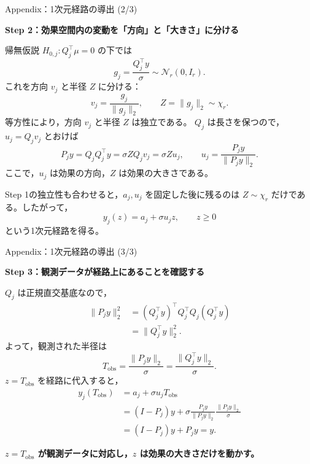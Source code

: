 \documentclass[aspectratio=169,11pt]{beamer}
\begin{document}
\begin{frame}{Appendix：1次元経路の導出 (2/3)}
  \small
  \setlength{\abovedisplayskip}{5pt}
  \setlength{\belowdisplayskip}{5pt}

  \textbf{Step 2：効果空間内の変動を「方向」と「大きさ」に分ける}

  帰無仮説 $H_{0,j}:Q_j^\top\mu=0$ の下では
  \[
    g_j=\frac{Q_j^\top y}{\sigma}
    \sim\mathcal N_r(0,I_r).
  \]
  これを方向 $v_j$ と半径 $Z$ に分ける：
  \[
    v_j=\frac{g_j}{\lVert g_j\rVert_2},\qquad
    Z=\lVert g_j\rVert_2\sim\chi_r.
  \]
  等方性により，方向 $v_j$ と半径 $Z$ は独立である。
  $Q_j$ は長さを保つので，$u_j=Q_jv_j$ とおけば
  \[
    P_jy=Q_jQ_j^\top y
         =\sigma ZQ_jv_j
         =\sigma Zu_j,\qquad
    u_j=\frac{P_jy}{\lVert P_jy\rVert_2}.
  \]
  ここで，$u_j$ は効果の方向，$Z$ は効果の大きさである。

  Step 1の独立性も合わせると，$a_j,u_j$ を固定した後に残るのは
  $Z\sim\chi_r$ だけである。したがって，
  \[
    \boxed{y_j(z)=a_j+\sigma u_jz,\qquad z\ge0}
  \]
  という1次元経路を得る。
\end{frame}

\begin{frame}{Appendix：1次元経路の導出 (3/3)}
  \small
  \setlength{\abovedisplayskip}{5pt}
  \setlength{\belowdisplayskip}{5pt}

  \textbf{Step 3：観測データが経路上にあることを確認する}

  $Q_j$ は正規直交基底なので，
  \[
    \begin{aligned}
      \lVert P_jy\rVert_2^2
      &=(Q_j^\top y)^\top Q_j^\top Q_j(Q_j^\top y) \\
      &=\lVert Q_j^\top y\rVert_2^2 .
    \end{aligned}
  \]
  よって，観測された半径は
  \[
    T_{\mathrm{obs}}
    =\frac{\lVert P_jy\rVert_2}{\sigma}
    =\frac{\lVert Q_j^\top y\rVert_2}{\sigma}.
  \]
  $z=T_{\mathrm{obs}}$ を経路に代入すると，
  \[
    \begin{aligned}
      y_j(T_{\mathrm{obs}})
      &=a_j+\sigma u_jT_{\mathrm{obs}} \\
      &=(I-P_j)y
        +\sigma\frac{P_jy}{\lVert P_jy\rVert_2}
        \frac{\lVert P_jy\rVert_2}{\sigma} \\
      &=(I-P_j)y+P_jy=y.
    \end{aligned}
  \]

  \vspace{0.15cm}
  \centering
  \textbf{$z=T_{\mathrm{obs}}$ が観測データに対応し，$z$ は効果の大きさだけを動かす。}
\end{frame}
\end{document}
